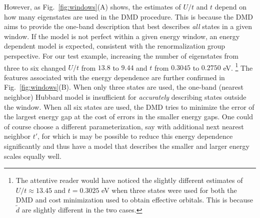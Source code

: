 However, as Fig.~\ref{fig:windows}(A) shows, the estimates of $U/t$ and $t$ depend on how many eigenstates 
are used in the DMD procedure. This is because the DMD aims to provide the one-band description 
that best describes \textit{all} states in a given window. If the model is not perfect within a given energy window, 
an energy dependent model is expected, consistent with the renormalization group perspective. For our test example, 
increasing the number of eigenstates from three to six changed $U/t$ from $13.8$ to $9.44$ and $t$ from $0.3045$ to $0.2750$ eV.
\footnote{The attentive reader would have noticed the slightly different estimates of $U/t\approx 13.45$ and $t=0.3025$ eV when 
three states were used for both the DMD and cost minimization used to obtain effective orbitals. This is because 
$\tilde{d}$ are slightly different in the two cases.} 
The features associated with the energy dependence are further confirmed in Fig.~\ref{fig:windows}(B). 
When only three states are used, the one-band (nearest neighbor) Hubbard model is insufficient for \textit{accurately}
describing states outside the window. When all six states are used, the DMD tries to minimize the error of the 
largest energy gap at the cost of errors in the smaller energy gaps. 
One could of course choose a different parameterization, say with additional next nearest neighbor $t'$, for which is 
may be possible to reduce this energy dependence significantly and thus have a model that describes the smaller 
and larger energy scales equally well.
 
 
